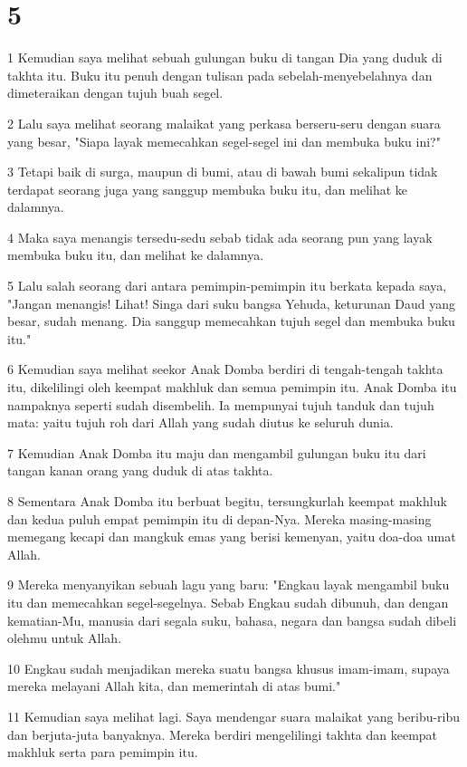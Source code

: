 \chapter{5}

\par 1 Kemudian saya melihat sebuah gulungan buku di tangan Dia yang duduk di takhta itu. Buku itu penuh dengan tulisan pada sebelah-menyebelahnya dan dimeteraikan dengan tujuh buah segel.
\par 2 Lalu saya melihat seorang malaikat yang perkasa berseru-seru dengan suara yang besar, "Siapa layak memecahkan segel-segel ini dan membuka buku ini?"
\par 3 Tetapi baik di surga, maupun di bumi, atau di bawah bumi sekalipun tidak terdapat seorang juga yang sanggup membuka buku itu, dan melihat ke dalamnya.
\par 4 Maka saya menangis tersedu-sedu sebab tidak ada seorang pun yang layak membuka buku itu, dan melihat ke dalamnya.
\par 5 Lalu salah seorang dari antara pemimpin-pemimpin itu berkata kepada saya, "Jangan menangis! Lihat! Singa dari suku bangsa Yehuda, keturunan Daud yang besar, sudah menang. Dia sanggup memecahkan tujuh segel dan membuka buku itu."
\par 6 Kemudian saya melihat seekor Anak Domba berdiri di tengah-tengah takhta itu, dikelilingi oleh keempat makhluk dan semua pemimpin itu. Anak Domba itu nampaknya seperti sudah disembelih. Ia mempunyai tujuh tanduk dan tujuh mata: yaitu tujuh roh dari Allah yang sudah diutus ke seluruh dunia.
\par 7 Kemudian Anak Domba itu maju dan mengambil gulungan buku itu dari tangan kanan orang yang duduk di atas takhta.
\par 8 Sementara Anak Domba itu berbuat begitu, tersungkurlah keempat makhluk dan kedua puluh empat pemimpin itu di depan-Nya. Mereka masing-masing memegang kecapi dan mangkuk emas yang berisi kemenyan, yaitu doa-doa umat Allah.
\par 9 Mereka menyanyikan sebuah lagu yang baru: "Engkau layak mengambil buku itu dan memecahkan segel-segelnya. Sebab Engkau sudah dibunuh, dan dengan kematian-Mu, manusia dari segala suku, bahasa, negara dan bangsa sudah dibeli olehmu untuk Allah.
\par 10 Engkau sudah menjadikan mereka suatu bangsa khusus imam-imam, supaya mereka melayani Allah kita, dan memerintah di atas bumi."
\par 11 Kemudian saya melihat lagi. Saya mendengar suara malaikat yang beribu-ribu dan berjuta-juta banyaknya. Mereka berdiri mengelilingi takhta dan keempat makhluk serta para pemimpin itu.
